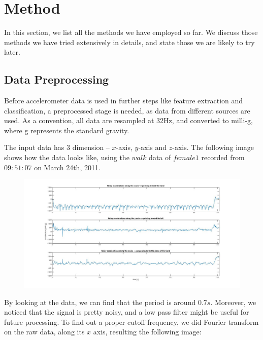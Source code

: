 \documentclass[10pt,twocolumn,letterpaper]{article}
\begin{document}
\section{Method}

In this section, we list all the methods we have employed so far. We discuss those methods we have tried extensively in details, and state those we are likely to try later.

\subsection{Data Preprocessing}

Before accelerometer data is used in further steps like feature extraction and classification, a preprocessed stage is needed, as data from different sources are used. As a convention, all data are resampled at 32Hz, and converted to milli-g, where g represents the standard gravity.

The input data has 3 dimension -- $x$-axis, $y$-axis and $z$-axis. The following image shows how the data looks like, using the $walk$ data of $female 1$ recorded from $09:51:07$ on March 24th, 2011. 

\begin{figure}[t]
\begin{center}
   \includegraphics[width=0.8\linewidth]{../img/fig1.jpg}
   \caption{}
\end{center}
\end{figure}

By looking at the data, we can find that the period is around $0.7s$. Moreover, we noticed that the signal is pretty noisy, and a low pass filter might be useful for future processing. To find out a proper cutoff frequency, we did Fourier transform on the raw data, along its $x$ axis, resulting the following image:
\end{document}
